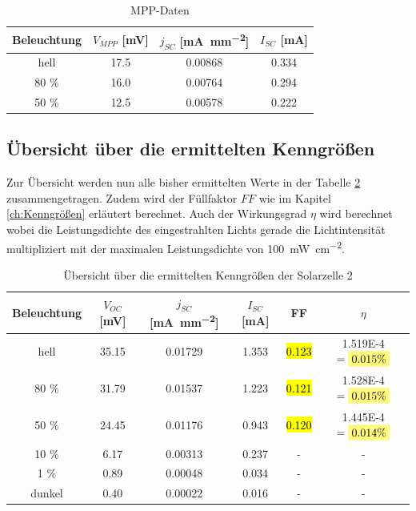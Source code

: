 \documentclass[12pt,a4paper,ngerman]{report}
\newcommand{\highlight}[1]{%
	\colorbox{yellow!50}{$\displaystyle#1$}} %
\begin{document}
\begin{table}[h!]
	\centering
	\begin{tabular}{c c c c}
		\toprule[1.5pt]
		Beleuchtung & $V_{MPP}$ [\si{\milli \volt}] & $j_{SC}$ [\si{\milli \ampere \per \milli \meter \squared}] & $I_{SC}$ [\si{\milli \ampere}] \\
		\midrule
		hell        & 17.5  &  0.00868  & 0.334      \\
		80 \%       & 16.0  &  0.00764  & 0.294       \\
		50 \%       & 12.5  &  0.00578  & 0.222        \\
		\bottomrule[1.5pt]
	\end{tabular}
	\caption{MPP-Daten}\label{table:MPP}
\end{table}

\subsection{Übersicht über die ermittelten Kenngrößen}
Zur Übersicht werden nun alle bisher ermittelten Werte in der Tabelle \ref{table:übersicht} zusammengetragen. Zudem wird der Füllfaktor $FF$ wie im Kapitel \ref{ch:Kenngrößen} erläutert berechnet. Auch der Wirkungsgrad $\eta$ wird berechnet wobei die Leistungsdichte des eingestrahlten Lichts gerade die Lichtintensität multipliziert mit der maximalen Leistungsdichte von \SI{100}{ \milli \watt \per \centi \meter \squared}.
\begin{table}[h!]
	\centering
	\begin{tabular}{c c c c c c }
		\toprule[1.5pt]
		Beleuchtung & $V_{OC}$ [\si{\milli \volt}] & $j_{SC}$ [\si{\milli \ampere \per \milli \meter \squared}] & $I_{SC}$ [\si{\milli \ampere}] & FF & $\eta$\\
		\midrule
		hell        & 35.15  &  0.01729  & 1.353 & \hl{0.123} & 1.519E-4 $= \highlight{0.015 \%}$  \\
		80 \%       & 31.79  &  0.01537  & 1.223 & \hl{0.121} & 1.528E-4 $= \highlight{0.015 \%}$  \\
		50 \%       & 24.45  &  0.01176  & 0.943 & \hl{0.120} & 1.445E-4 $= \highlight{0.014 \%}$  \\
		10 \%       & 6.17   &  0.00313  & 0.237 &   -   & -   \\
		1  \%       & 0.89   &  0.00048  & 0.034 &   -   & -\\
		dunkel      & 0.40   &  0.00022  & 0.016 &   -   & - \\
		\bottomrule[1.5pt]
	\end{tabular}
	\caption{Übersicht über die ermittelten Kenngrößen der Solarzelle 2}\label{table:übersicht}
\end{table}
\end{document}
